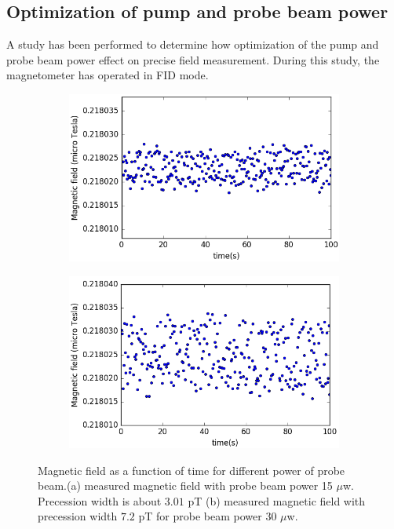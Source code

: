 \subsection{Optimization of pump and probe beam power} 
A study has been performed to determine how optimization of the pump
and probe beam power effect on precise field measurement.  During this
study, the magnetometer has operated in FID mode.
  \begin{figure}
    \centering
    \begin{subfigure}[b]{0.7\textwidth}
        \centering
        \includegraphics[width=\textwidth]{figures/beam_power_less}
        \caption{}
        \label{fig:power less}
    \end{subfigure}

    \begin{subfigure}[b]{0.7\textwidth}
        \centering
        \includegraphics[width=\textwidth]{figures/beam_power_double}
        \caption{}
        \label{fig:power double}
    \end{subfigure}
    \caption{ Magnetic field as a function of time for different power of probe beam.(a) measured magnetic field with probe beam power 15 $\mu$w. Precession width is about $3.01$ pT (b) measured magnetic field with precession width $7.2$ pT for probe beam power 30 $\mu$w.}
    \label{fig:different probe power}
\end{figure}
 
